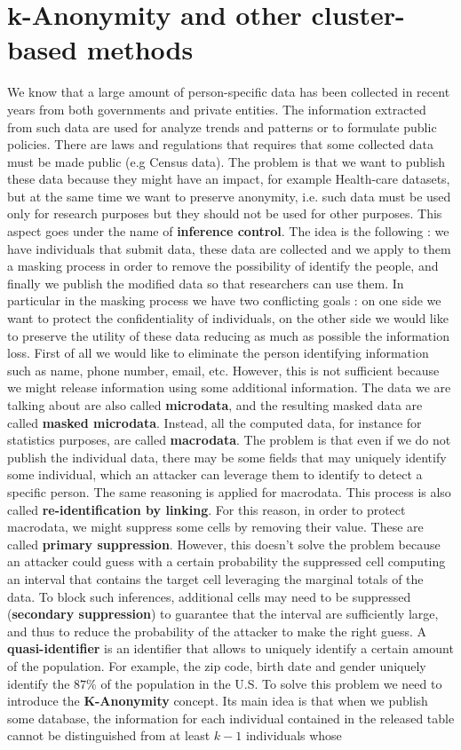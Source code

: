 \section{k-Anonymity and other cluster-based methods}
We know that a large amount of person-specific data has been collected in recent years from both governments and private entities. The information extracted from such data are used for analyze trends and patterns or to formulate public policies. There are laws and regulations that requires that some collected data must be made public (e.g Census data). The problem is that we want to publish these data because they might have an impact, for example Health-care datasets, but at the same time we want to preserve anonymity, i.e. such data must be used only for research purposes but they should not be used for other purposes. This aspect goes under the name of \textbf{inference control}. The idea is the following : we have individuals that submit data, these data are collected and we apply to them a masking process in order to remove the possibility of identify the people, and finally we publish the modified data so that researchers can use them. In particular in the masking process we have two conflicting goals : on one side we want to protect the confidentiality of individuals, on the other side we would like to preserve the utility of these data reducing as much as possible the information loss. First of all we would like to eliminate the person identifying information such as name, phone number, email, etc. However, this is not sufficient because we might release information using some additional information. The data we are talking about are also called \textbf{microdata}, and the resulting masked data are called \textbf{masked microdata}. Instead, all the computed data, for instance for statistics purposes, are called \textbf{macrodata}. The problem is that even if we do not publish the individual data, there may be some fields that may uniquely identify some individual, which an attacker can leverage them to identify to detect a specific person. The same reasoning is applied for macrodata. This process is also called \textbf{re-identification by linking}. For this reason, in order to protect macrodata, we might suppress some cells by removing their value. These are called \textbf{primary suppression}. However, this doesn't solve the problem because an attacker could guess with a certain probability the suppressed cell computing an interval that contains the target cell leveraging the marginal totals of the data. To block such inferences, additional cells may need to be suppressed (\textbf{secondary suppression}) to guarantee that the interval are sufficiently large, and thus to reduce the probability of the attacker to make the right guess. A \textbf{quasi-identifier} is an identifier that allows to uniquely identify a certain amount of the population. For example, the zip code, birth date and gender uniquely identify the $87 \%$ of the population in the U.S. To solve this problem we need to introduce the \textbf{K-Anonymity} concept. Its main idea is that when we publish some database, the information for each individual contained in the released table cannot be distinguished from at least $k - 1$ individuals whose 